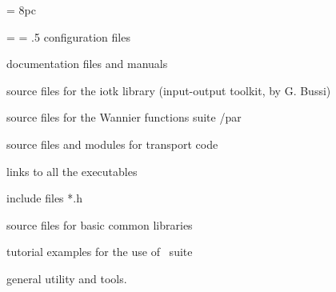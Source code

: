 \newdimen\descindent \descindent = 8pc
{\noindent \leftskip = \descindent \parskip = .5\baselineskip
{}%
configuration files\par

\noindent{}%
documentation files and manuals \par

\noindent{}%
source files for the iotk library (input-output toolkit, by G. Bussi) \par

\noindent{}%
source files for the Wannier functions suite 
/par

\noindent{}%
source files and modules for transport code
\par

\noindent{}%
links to all the executables \par

\noindent{}%
include files *.h \par

\noindent{}%
source files for basic common libraries \par

\noindent{}%
tutorial examples for the use of \WANT\ suite 
\par

\noindent{}%
general utility and tools. \par}


